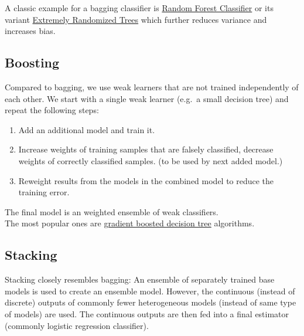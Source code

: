 \documentclass[
]{book}
\providecommand{\tightlist}{%
  \setlength{\itemsep}{0pt}\setlength{\parskip}{0pt}}
\begin{document}
A classic example for a bagging classifier is \href{https://scikit-learn.org/stable/modules/generated/sklearn.ensemble.RandomForestClassifier.html}{Random Forest
Classifier}
or its variant \href{https://scikit-learn.org/stable/modules/generated/sklearn.ensemble.RandomForestClassifier.html}{Extremely Randomized
Trees}
which further reduces variance and increases bias.

\hypertarget{boosting}{%
\subsection{Boosting}\label{boosting}}

Compared to bagging, we use weak learners that are not trained
independently of each other. We start with a single weak learner (e.g.~a
small decision tree) and repeat the following steps:

\begin{enumerate}
\def\labelenumi{\arabic{enumi}.}
\tightlist
\item
  Add an additional model and train it.
\item
  Increase weights of training samples that are falsely classified,
  decrease weights of correctly classified samples. (to be used by
  next added model.)
\item
  Reweight results from the models in the combined model to reduce the
  training error.
\end{enumerate}

The final model is an weighted ensemble of weak classifiers.\\
The most popular ones are \href{https://scikit-learn.org/stable/modules/generated/sklearn.ensemble.GradientBoostingClassifier.html\#sklearn.ensemble.GradientBoostingClassifier}{gradient boosted decision
tree}
algorithms.

\hypertarget{stacking}{%
\subsection{Stacking}\label{stacking}}

Stacking closely resembles bagging: An ensemble of separately trained
base models is used to create an ensemble model. However, the continuous
(instead of discrete) outputs of commonly fewer heterogeneous models
(instead of same type of models) are used. The continuous outputs are
then fed into a final estimator (commonly logistic regression
classifier).
\end{document}
